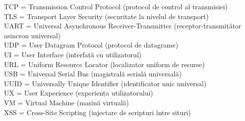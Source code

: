 \documentclass[12pt, a4paper, twoside, romanian]{teza-upb}
\begin{document}
{  TCP = Transmission Control Protocol (protocol de control al transmisiei)\\
  TLS = Transport Layer Security (securitate la nivelul de transport)\\
  UART = Universal Asynchronous Receiver-Transmitter (receptor-transmițător asincron universal)\\
  UDP = User Datagram Protocol (protocol de datagrame)\\
  UI = User Interface (interfață cu utilizatorul)\\
  URL = Uniform Resource Locator (localizator uniform de resurse)\\
  USB = Universal Serial Bus (magistrală serială universală)\\
  UUID = Universally Unique Identifier (identificator unic universal)\\
  UX = User Experience (experiența utilizatorului)\\
  VM = Virtual Machine (mașină virtuală)\\
  XSS = Cross-Site Scripting (injectare de scripturi între situri)
}
\afterpreface

\makeatletter
\renewcommand{\ps@plain}{\let\@mkboth\@gobbletwo
  \def\@oddhead{}\def\@evenhead{}%
  \def\@oddfoot{\hfil\thepage\hfil}\def\@evenfoot{\@oddfoot}}
\renewcommand{\ps@topright}{\let\@mkboth\@gobbletwo
  \def\@oddhead{}\def\@evenhead{}%
  \def\@oddfoot{\hfil\thepage\hfil}\def\@evenfoot{\@oddfoot}}
\makeatother
\pagestyle{topright}









{\singlespacing
\printbibliography[heading=bibintoc,title={Bibliografie}]
}


\end{document}

